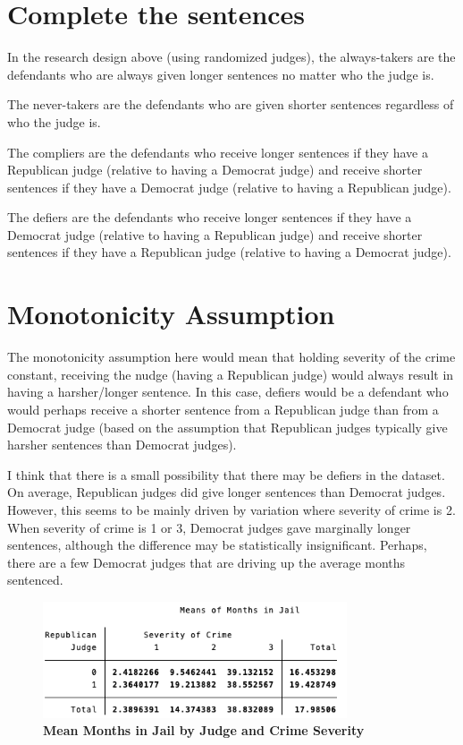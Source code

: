 \documentclass{article}
\begin{document}
\section{Complete the sentences}
In the research design above (using randomized judges), the always-takers are the defendants who are always given longer sentences no matter who the judge is. 

The never-takers are the defendants who are given shorter sentences regardless of who the judge is. 

The compliers are the defendants who receive longer sentences if they have a Republican judge (relative to having a Democrat judge) and receive shorter sentences if they have a Democrat judge (relative to having a Republican judge). 

The defiers are the defendants who receive longer sentences if they have a Democrat judge (relative to having a Republican judge) and receive shorter sentences if they have a Republican judge (relative to having a Democrat judge). 


\section{Monotonicity Assumption}
The monotonicity assumption here would mean that holding severity of the crime constant, receiving the nudge (having a Republican judge) would always result in having a harsher/longer sentence. In this case, defiers would be a defendant who would perhaps receive a shorter sentence from a Republican judge than from a Democrat judge (based on the assumption that Republican judges typically give harsher sentences than Democrat judges). 

I think that there is a small possibility that there may be defiers in the dataset. On average, Republican judges did give longer sentences than Democrat judges. However, this seems to be mainly driven by variation where severity of crime is 2. When severity of crime is 1 or 3, Democrat judges gave marginally longer sentences, although the difference may be statistically insignificant. Perhaps, there are a few Democrat judges that are driving up the average months sentenced.

\begin{figure}[htbp]
\caption{\textbf{Mean Months in Jail by Judge and Crime Severity}
\label{tab:EngApproach}}
\center
	\includegraphics[width=90mm]{averages.png}
    \center
\end{figure}
\end{document}
